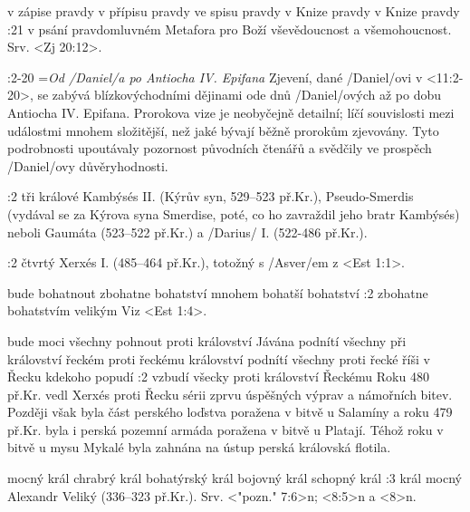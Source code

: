     {v zápise pravdy}   %
    {v přípisu pravdy}   %
    {ve spisu pravdy}   %
    {v Knize pravdy}   %
    {v Knize pravdy}   %
:21 {v psání pravdomluvném}
Metafora pro Boží vševědoucnost a všemohoucnost. Srv. <Zj 20:12>.


:2-20 {}={\em Od \x/Daniel/a po Antiocha IV. Epifana} 
    Zjevení, dané \x/Daniel/ovi v <11:2-20>, se zabývá blízkovýchodními dějinami ode dnů \x/Daniel/ových až po dobu Antiocha IV. Epifana. Prorokova vize je neobyčejně detailní; líčí  souvislosti mezi událostmi mnohem složitější, než jaké bývají běžně prorokům zjevovány. Tyto podrobnosti upoutávaly pozornost původních čtenářů a svědčily ve prospěch \x/Daniel/ovy důvěryhodnosti.

:2 {tři králové} Kambýsés II. (Kýrův syn, 529--523 př.Kr.), Pseudo-Smerdis (vydával se za Kýrova syna Smerdise, poté, co ho zavraždil jeho bratr Kambýsés) neboli Gaumáta (523--522 př.Kr.) a \x/Darius/ I. (522-486 př.Kr.).

:2 {čtvrtý} Xerxés I. (485--464 př.Kr.), totožný s \x/Asver/em z <Est 1:1>.

    {bude bohatnout}   %
    {zbohatne}   %
    {bohatství}   %
    {mnohem bohatší}   %
    {bohatství}   %
:2 {zbohatne bohatstvím velikým} Viz <Est 1:4>.

    {bude moci všechny pohnout proti království Jávána}   %
    {podnítí všechny při království řeckém}   %
    {proti řeckému království}   %
    {podnítí všechny proti řecké říši}   %
    {v Řecku kdekoho popudí}   %
:2 {vzbudí všecky proti království Řeckému} Roku 480 př.Kr. vedl Xerxés proti Řecku sérii zprvu úspěšných výprav a námořních bitev. Později však byla část perského loďstva poražena v bitvě u Salamíny a roku 479 př.Kr. byla i perská pozemní armáda poražena v bitvě u Platají. Téhož roku  v bitvě u mysu Mykalé byla zahnána na ústup perská královská flotila.

    {mocný král}   %
    {chrabrý král}   %
    {bohatýrský král}   %
    {bojovný král}   %
    {schopný král}   %
:3 {král mocný} Alexandr Veliký (336--323 př.Kr.). Srv. <"pozn." 7:6>n; <8:5>n a  <8>n.  

